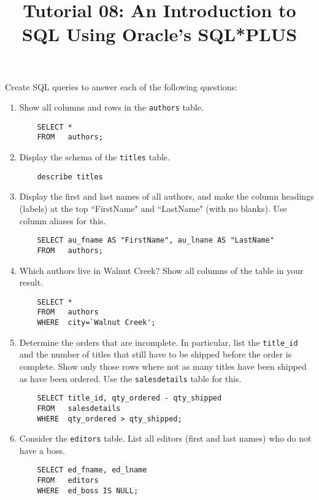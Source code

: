 \documentclass{article}
\title{Tutorial 08: An Introduction to SQL Using Oracle's SQL*PLUS}
\begin{document}
	\maketitle

\noindent Create SQL queries to answer each of the following questions:

\begin{enumerate}
\item Show all columns and rows in the \texttt{authors} table.
	\begin{verbatim}
	SELECT *
	FROM   authors;
	\end{verbatim}

\item Display the schema of the \texttt{titles} table.
	\begin{verbatim}
	describe titles
	\end{verbatim}
	
\item Display the first and last names of all authors, and make the column headings (labels) at the top ``FirstName" and ``LastName" (with no blanks). Use column aliases for this.
	\begin{verbatim}
	SELECT au_fname AS "FirstName", au_lnane AS "LastName"
	FROM   authors;
	\end{verbatim}

\item Which authors live in Walnut Creek? Show all columns of the table in your result.
	\begin{verbatim}
	SELECT *
	FROM   authors
	WHERE  city=`Walnut Creek';
	\end{verbatim}
	
\item Determine the orders that are incomplete. In particular, list the \texttt{title\_id} and the number of titles that still have to be shipped before the order is complete. Show only those rows where not as many titles have been shipped as have been ordered. Use the \texttt{salesdetails} table for this.
	\begin{verbatim}
	SELECT title_id, qty_ordered - qty_shipped
	FROM   salesdetails
	WHERE  qty_ordered > qty_shipped;
	\end{verbatim}

\item Consider the \texttt{editors} table. List all editors (first and last names) who do not have a boss.
	\begin{verbatim}
	SELECT ed_fname, ed_lname
	FROM   editors
	WHERE  ed_boss IS NULL;
	\end{verbatim}


\end{enumerate}
\end{document}
